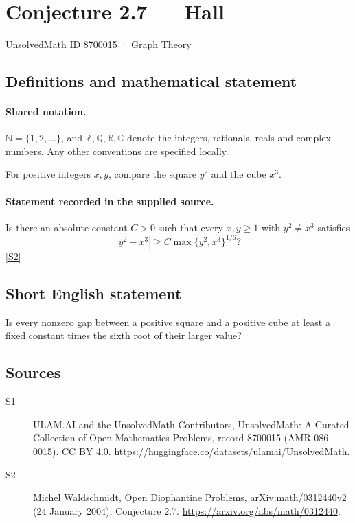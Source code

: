 \documentclass[11pt]{article}
\newcommand{\sref}[2]{\hyperlink{source:#1:#2}{[S#2]}}
\begin{document}
\setcounter{section}{8700014}
\section{Conjecture 2.7 — Hall}\label{8700015}
{\small\sffamily UnsolvedMath ID 8700015 · Graph Theory}
\subsection{Definitions and mathematical statement}

\paragraph{Shared notation.}$\mathbb N=\{1,2,\ldots\}$, and $\mathbb Z,\mathbb Q,\mathbb R,\mathbb C$ denote the integers, rationals, reals and complex numbers. Any other conventions are specified locally.


For positive integers $x,y$, compare the square $y^2$ and the cube $x^3$.
\paragraph{Statement recorded in the supplied source.}
Is there an absolute constant $C>0$ such that every $x,y\ge1$ with $y^2\ne x^3$ satisfies \[|y^2-x^3|\ge C\max\{y^2,x^3\}^{1/6}?\] \sref{8700015}{2}
\subsection{Short English statement}
Is every nonzero gap between a positive square and a positive cube at least a fixed constant times the sixth root of their larger value?
\subsection{Sources}
\begin{description}
\item[\hypertarget{source:8700015:1}{S1}] ULAM.AI and the UnsolvedMath Contributors, UnsolvedMath: A Curated Collection of Open Mathematics Problems, record 8700015 (AMR-086-0015). CC BY 4.0. \url{https://huggingface.co/datasets/ulamai/UnsolvedMath}.
\item[\hypertarget{source:8700015:2}{S2}] Michel Waldschmidt, Open Diophantine Problems, arXiv:math/0312440v2 (24 January 2004), Conjecture 2.7. \url{https://arxiv.org/abs/math/0312440}.
\end{description}
\label{end:8700015}
\end{document}
